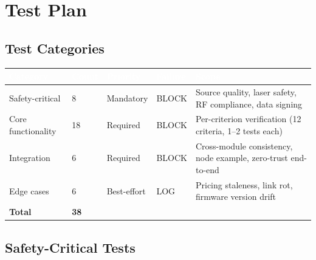 \documentclass[11pt,letterpaper]{article}
\newcommand{\tableheader}[1]{\textbf{\sffamily\textcolor{white}{#1}}}
\begin{document}
\section{Test Plan}

\subsection{Test Categories}

\begin{center}
\begin{tabularx}{\textwidth}{L{3cm}C{1.5cm}C{2cm}C{2cm}X}
\toprule
{}
\tableheader{Category} & \tableheader{Count} & \tableheader{Priority} & \tableheader{Failure} & \tableheader{Scope} \\
\midrule
Safety-critical & 8 & Mandatory & BLOCK & Source quality, laser safety, RF compliance, data signing \\
Core functionality & 18 & Required & BLOCK & Per-criterion verification (12 criteria, 1--2 tests each) \\
Integration & 6 & Required & BLOCK & Cross-module consistency, node example, zero-trust end-to-end \\
Edge cases & 6 & Best-effort & LOG & Pricing staleness, link rot, firmware version drift \\
\midrule
\textbf{Total} & \textbf{38} & & & \\
\bottomrule
\end{tabularx}
\end{center}

\subsection{Safety-Critical Tests}
\end{document}

